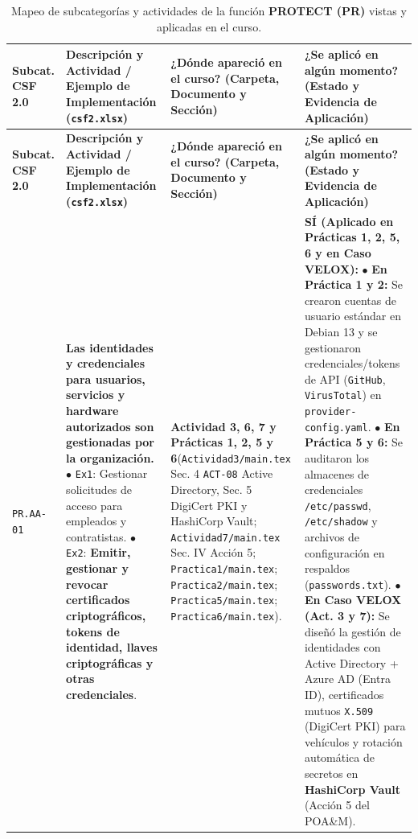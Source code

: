 \documentclass[letterpaper,11pt]{article}
\begin{document}
\begingroup
\scriptsize
\setlength{\tabcolsep}{3.5pt}
\renewcommand{\arraystretch}{1.24}
\begin{longtable}{|C{1.5cm}|L{5.3cm}|L{4.3cm}|L{5.8cm}|}
\caption{Mapeo de subcategorías y actividades de la función \textbf{PROTECT (PR)} vistas y aplicadas en el curso.}
\label{tab:mapeo-pr} \\
\hline
{}
\textbf{Subcat. CSF 2.0} & \textbf{Descripción y Actividad / Ejemplo de Implementación (\texttt{csf2.xlsx})} & \textbf{¿Dónde apareció en el curso? (Carpeta, Documento y Sección)} & \textbf{¿Se aplicó en algún momento? (Estado y Evidencia de Aplicación)} \\
\hline
\endfirsthead
\hline
{}
\textbf{Subcat. CSF 2.0} & \textbf{Descripción y Actividad / Ejemplo de Implementación (\texttt{csf2.xlsx})} & \textbf{¿Dónde apareció en el curso? (Carpeta, Documento y Sección)} & \textbf{¿Se aplicó en algún momento? (Estado y Evidencia de Aplicación)} \\
\hline
\endhead
\hline
\endfoot

\texttt{PR.AA-01} &
\textbf{Las identidades y credenciales para usuarios, servicios y hardware autorizados son gestionadas por la organización.}\newline
$\bullet$ \texttt{Ex1}: Gestionar solicitudes de acceso para empleados y contratistas.\newline
$\bullet$ \texttt{Ex2}: \textbf{Emitir, gestionar y revocar certificados criptográficos, tokens de identidad, llaves criptográficas y otras credenciales}. &
\textbf{Actividad 3, 6, 7 y Prácticas 1, 2, 5 y 6}\newline (\texttt{Actividad3/main.tex} Sec. 4 \texttt{ACT-08} Active Directory, Sec. 5 DigiCert PKI y HashiCorp Vault; \texttt{Actividad7/main.tex} Sec. IV Acción 5; \texttt{Practica1/main.tex}; \texttt{Practica2/main.tex}; \texttt{Practica5/main.tex}; \texttt{Practica6/main.tex}). &
\textbf{SÍ (Aplicado en Prácticas 1, 2, 5, 6 y en Caso VELOX):}\newline
$\bullet$ \textbf{En Práctica 1 y 2:} Se crearon cuentas de usuario estándar en Debian 13 y se gestionaron credenciales/tokens de API (\texttt{GitHub}, \texttt{VirusTotal}) en \texttt{provider-config.yaml}.\newline
$\bullet$ \textbf{En Práctica 5 y 6:} Se auditaron los almacenes de credenciales \texttt{/etc/passwd}, \texttt{/etc/shadow} y archivos de configuración en respaldos (\texttt{passwords.txt}).\newline
$\bullet$ \textbf{En Caso VELOX (Act. 3 y 7):} Se diseñó la gestión de identidades con Active Directory + Azure AD (Entra ID), certificados mutuos \texttt{X.509} (DigiCert PKI) para vehículos y rotación automática de secretos en \textbf{HashiCorp Vault} (Acción 5 del POA\&M). \\
\hline


\end{longtable}
\end{document}

